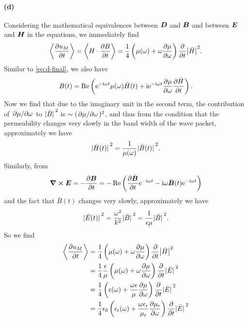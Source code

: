 \documentclass[hyperref, a4paper]{article}
\newcommand*{\ii}{\mathrm{i}}
\newcommand*{\ee}{\mathrm{e}}
\newcommand{\epsr}{\epsilon_{\text{r}}}
\newcommand*{\mur}{\mu_{\text{r}}}
\begin{document}
\paragraph{(d)} Considering the mathematical equivalences between 
$\vb*{D}$ and $\vb*{B}$ and between $\vb*{E}$ and $\vb*{H}$ in the equations, 
we immediately find 
\begin{equation}
    \expval{\pdv{u_M}{t}} = \expval{H \cdot \pdv{B}{t}} 
    = \frac{1}{4} \left(
        \mu(\omega) + \omega \pdv{\mu}{\omega}
    \right) \pdv{t} \abs{\bar{H}}^2.
\end{equation}
Similar to \eqref{eq:d-final}, we also have 
\begin{equation}
    B(t) = \Re \left(
        \ee^{- \ii \omega t} \mu(\omega) \bar{H}(t) 
        + \ii \ee^{- \ii \omega t} \pdv{\mu}{\omega} \pdv{\bar{H}}{t}
    \right).
\end{equation}
Now we find that due to the imaginary unit in the second term, 
the contribution of $\pdv*{\mu}{\omega}$ to $\abs*{\bar{B}}^2$
is $\sim (\pdv*{\mu}{\omega})^2$,
and thus from the condition that the permeability changes very slowly
in the band width of the wave packet, approximately we have 
\begin{equation}
    \abs*{\bar{H}(t)}^2 = \frac{1}{\mu(\omega)} \abs*{\bar{B}(t)}^2.
\end{equation} 
Similarly, from 
\begin{equation}
    \curl{\vb*{E}} = - \pdv{\vb*{B}}{t} 
    = - \Re \left(
        \pdv{\bar{\vb*{B}}}{t} \ee^{- \ii \omega t} 
        - \ii \omega \bar{\vb*{B}}(t) \ee^{- \ii \omega t}
    \right)
\end{equation}
and the fact that $\bar{B}(t)$ changes very slowly, approximately we have 
\begin{equation}
    \abs*{\bar{E}(t)}^2 = \frac{\omega^2}{k^2} \abs*{\bar{B}}^2
    = \frac{1}{\epsilon \mu}  \abs*{\bar{B}}^2.
\end{equation}
So we find 
\begin{equation}
    \begin{aligned}
        \expval{\pdv{u_M}{t}} 
        &= \frac{1}{4} \left(
            \mu(\omega) + \omega \pdv{\mu}{\omega}
        \right) \pdv{t} \abs{\bar{H}}^2 \\
        &= \frac{1}{4} \frac{\epsilon}{\mu} \left(
            \mu(\omega) + \omega \pdv{\mu}{\omega}
        \right) \pdv{t} \abs*{\bar{E}}^2 \\
        &= \frac{1}{4} \left(
            \epsilon(\omega) + \frac{\omega \epsilon}{\mu} \pdv{\mu}{\omega}
        \right) \pdv{t} \abs*{\bar{E}}^2 \\
        &= \frac{1}{4} \epsilon_0 \left(
            \epsr(\omega) + \frac{\omega \epsr}{\mur} \pdv{\mur}{\omega}
        \right) \pdv{t} \abs*{\bar{E}}^2 
    \end{aligned}
\end{equation}
\end{document}
